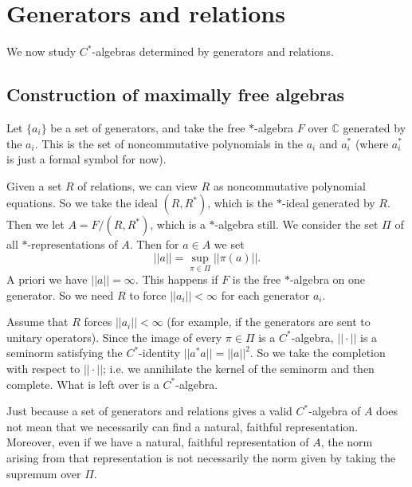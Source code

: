 \documentclass[12pt]{report}
\newcommand{\CC}{\mathbb{C}}
\theoremstyle{definition}
\begin{document}
\chapter{Generators and relations}
We now study $C^*$-algebras determined by generators and relations.

\section{Construction of maximally free algebras}
Let $\{a_i\}$ be a set of generators, and take the free $*$-algebra $F$ over $\CC$ generated by the $a_i$. This is the set of noncommutative polynomials in the $a_i$ and $a_i^*$ (where $a_i^*$ is just a formal symbol for now).

Given a set $R$ of relations, we can view $R$ as noncommutative polynomial equations. So we take the ideal $(R, R^*)$, which is the $*$-ideal generated by $R$. Then we let $A = F/(R, R^*)$, which is a $*$-algebra still. We consider the set $\Pi$ of all $*$-representations of $A$. Then for $a \in A$ we set
$$||a|| = \sup_{\pi \in \Pi} ||\pi(a)||.$$
A priori we have $||a|| = \infty$. This happens if $F$ is the free $*$-algebra on one generator. So we need $R$ to force $||a_i|| < \infty$ for each generator $a_i$. 

Assume that $R$ forces $||a_i|| < \infty$ (for example, if the generators are sent to unitary operators). Since the image of every $\pi \in \Pi$ is a $C^*$-algebra, $||\cdot||$ is a seminorm satisfying the $C^*$-identity $||a^*a|| = ||a||^2$. So we take the completion with respect to $||\cdot||$; i.e. we annihilate the kernel of the seminorm and then complete. What is left over is a $C^*$-algebra.

Just because a set of generators and relations gives a valid $C^*$-algebra of $A$ does not mean that we necessarily can find a natural, faithful representation. Moreover, even if we have a natural, faithful representation of $A$, the norm arising from that representation is not necessarily the norm given by taking the supremum over $\Pi$.
\end{document}
